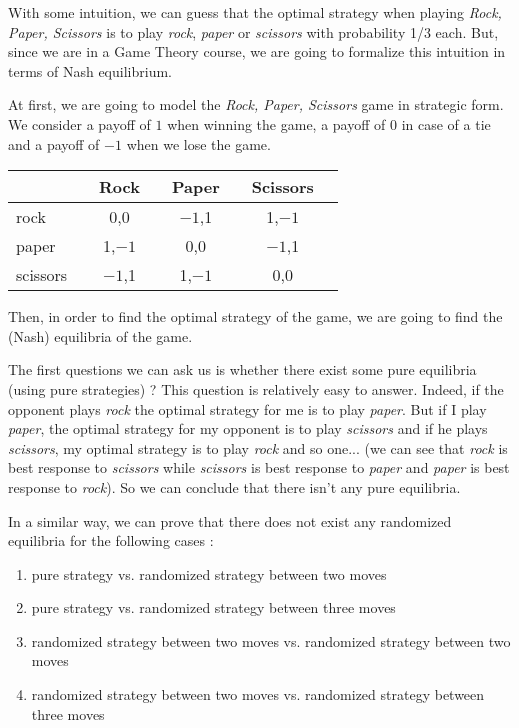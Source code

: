 With some intuition, we can guess that the optimal strategy when playing \textit{Rock, Paper, Scissors} is to play \textit{rock}, \textit{paper} or \textit{scissors} with probability 1/3 each. But, since we are in a Game Theory course, we are going to formalize this intuition in terms of Nash equilibrium.

At first, we are going to model the \textit{Rock, Paper, Scissors} game in strategic form. We consider a payoff of $1$ when winning the game, a payoff of $0$ in case of a tie and a payoff of $-1$ when we lose the game.
\begin{center}
\begin{tabular}[h!]{l|ccccccc}
	&& \Large{Rock} && \Large{Paper} && \Large{Scissors} & \\
	\hline
	\Large{rock} && \Large{0,0} && \Large{$-1$,1} && \Large{1,$-1$} & \\
	\Large{paper} && \Large{1,$-1$} && \Large{0,0} && \Large{$-1$,1} & \\
	\Large{scissors} && \Large{$-1$,1} && \Large{1,$-1$} && \Large{0,0} & \\
\end{tabular}
\end{center}

Then, in order to find the optimal strategy of the game, we are going to find the (Nash) equilibria of the game.

The first questions we can ask us is whether there exist some pure equilibria (using pure strategies) ? This question is relatively easy to answer. Indeed, if the opponent plays \textit{rock} the optimal strategy for me is to play \textit{paper}. But if I play \textit{paper}, the optimal strategy for my opponent is to play \textit{scissors} and if he plays \textit{scissors}, my optimal strategy is to play \textit{rock} and so one... (we can see that \textit{rock} is best response to \textit{scissors} while \textit{scissors} is best response to \textit{paper} and \textit{paper} is best response to \textit{rock}). So we can conclude that there isn't any pure equilibria.

In a similar way, we can prove that there does not exist any randomized equilibria for the following cases : 
\begin{enumerate}
\item pure strategy vs. randomized strategy between two moves
\item pure strategy vs. randomized strategy between three moves
\item randomized strategy between two moves vs. randomized strategy between two moves
\item randomized strategy between two moves vs. randomized strategy between three moves
\end{enumerate}

